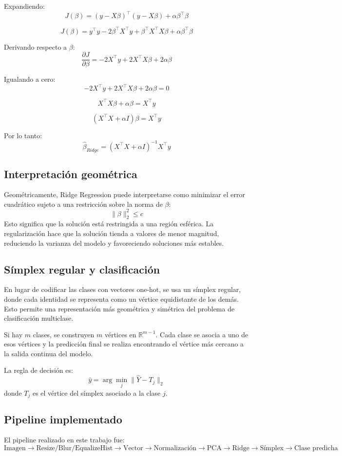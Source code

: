\documentclass[12pt,a4paper]{article}
\begin{document}
Expandiendo:
\[
J(\beta) = (y - X\beta)^\top (y - X\beta) + \alpha \beta^\top \beta
\]

\[
J(\beta) = y^\top y - 2\beta^\top X^\top y + \beta^\top X^\top X \beta + \alpha \beta^\top \beta
\]

Derivando respecto a $\beta$:
\[
\frac{\partial J}{\partial \beta} = -2X^\top y + 2X^\top X \beta + 2\alpha \beta
\]

Igualando a cero:
\[
-2X^\top y + 2X^\top X \beta + 2\alpha \beta = 0
\]

\[
X^\top X \beta + \alpha \beta = X^\top y
\]

\[
(X^\top X + \alpha I)\beta = X^\top y
\]

Por lo tanto:
\[
\hat{\beta}_{Ridge} = (X^\top X + \alpha I)^{-1}X^\top y
\]

\subsection{Interpretación geométrica}
Geométricamente, Ridge Regression puede interpretarse como minimizar el error cuadrático sujeto a una restricción sobre la norma de $\beta$:
\[
\|\beta\|_2^2 \leq c
\]
Esto significa que la solución está restringida a una región esférica. La regularización hace que la solución tienda a valores de menor magnitud, reduciendo la varianza del modelo y favoreciendo soluciones más estables.

\subsection{Símplex regular y clasificación}
En lugar de codificar las clases con vectores one-hot, se usa un símplex regular, donde cada identidad se representa como un vértice equidistante de los demás. Esto permite una representación más geométrica y simétrica del problema de clasificación multiclase.

Si hay $m$ clases, se construyen $m$ vértices en $\mathbb{R}^{m-1}$. Cada clase se asocia a uno de esos vértices y la predicción final se realiza encontrando el vértice más cercano a la salida continua del modelo.

La regla de decisión es:
\[
\hat{y} = \arg\min_j \| \hat{Y} - T_j \|_2
\]
donde $T_j$ es el vértice del símplex asociado a la clase $j$.

\subsection{Pipeline implementado}
El pipeline realizado en este trabajo fue:
\[
\text{Imagen} \rightarrow \text{Resize/Blur/EqualizeHist} \rightarrow \text{Vector} \rightarrow \text{Normalización} \rightarrow \text{PCA} \rightarrow \text{Ridge} \rightarrow \text{Símplex} \rightarrow \text{Clase predicha}
\]
\end{document}

